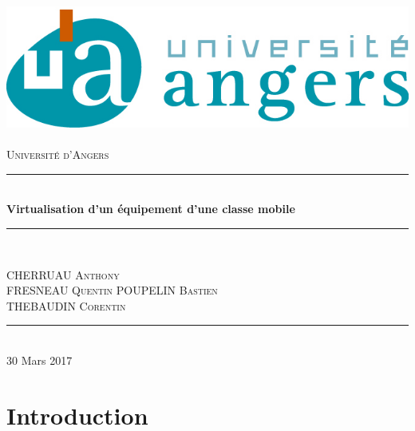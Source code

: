\documentclass[a4paper,12pt]{extarticle}
\newcommand{\HRule}{\rule{\linewidth}{0.5mm}}
\begin{document}
\begin{titlepage}
  \begin{sffamily}
  \begin{center}

    \includegraphics[scale=1]{univangers.jpg}~\\[1.5cm]

    \textsc{\LARGE Université d'Angers}\\[2cm]

   

    \HRule \\[0.4cm]
    { \huge \bfseries Virtualisation d'un équipement d'une classe mobile}{\bfseries  \\[0.4cm] }

    \HRule \\[2cm]
    

    \begin{minipage}{0.4\textwidth}
      \begin{flushleft} \large
        CHERRUAU \textsc{Anthony}\\
        FRESNEAU \textsc{Quentin}
        POUPELIN \textsc{Bastien}\\
        THEBAUDIN \textsc{Corentin}
      \end{flushleft}
    \end{minipage}
    

    \vfill
    \HRule\\[2cm]
    {\large 30 Mars 2017}

  \end{center}
  \end{sffamily}
\end{titlepage}
\clearpage

\tableofcontents

\clearpage

\section{Introduction}
\end{document}
